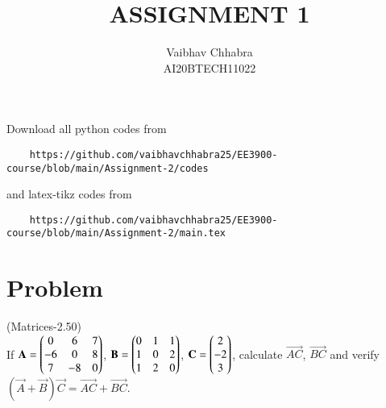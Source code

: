 \documentclass[journal,12pt,twocolumn]{IEEEtran}
\begin{document}
     \def\topbox#1{\raisebox{-\baselineskip}[0in][0in]{#1}}
     \def\midbox#1{\raisebox{-0.5\baselineskip}[0in][0in]{#1}}
\vspace{3cm}
\title{ASSIGNMENT 1}
\author{Vaibhav Chhabra\\ AI20BTECH11022}
\maketitle
\newpage
\bigskip
\renewcommand{\thefigure}{\theenumi}
\renewcommand{\thetable}{\theenumi}
Download all python codes from 
\begin{lstlisting}
    https://github.com/vaibhavchhabra25/EE3900-course/blob/main/Assignment-2/codes
\end{lstlisting}
%
and latex-tikz codes from 
%
\begin{lstlisting}
    https://github.com/vaibhavchhabra25/EE3900-course/blob/main/Assignment-2/main.tex
\end{lstlisting}
%
\section{Problem}
(Matrices-2.50)\\
If $\mathbf{A}=\begin{pmatrix}0&6&7\\-6&0&8\\7&-8&0\end{pmatrix}$, $\mathbf{B}=\begin{pmatrix}0&1&1\\1&0&2\\1&2&0\end{pmatrix}$, $\mathbf{C}=\begin{pmatrix}2\\-2\\3\end{pmatrix}$, calculate $\vec{AC}$, $\vec{BC}$ and verify $(\vec{A}+\vec{B})\vec{C}=\vec{AC}+\vec{BC}$.
\end{document}
